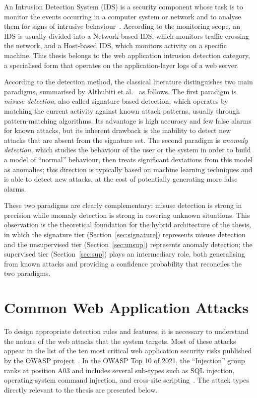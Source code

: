 \documentclass[../main.tex]{subfiles}
\begin{document}
An Intrusion Detection System (IDS) is a security component whose task is
to monitor the events occurring in a computer system or network and to
analyse them for signs of intrusive behaviour~\cite{tsai2009}. According to
the monitoring scope, an IDS is usually divided into a Network-based IDS,
which monitors traffic crossing the network, and a Host-based IDS, which
monitors activity on a specific machine. This thesis belongs to the web
application intrusion detection category, a specialised form that operates
on the application-layer logs of a web server.

According to the detection method, the classical literature distinguishes
two main paradigms, summarised by Althubiti et al.~\cite{althubiti2017} as
follows. The first paradigm is \emph{misuse detection}, also called
signature-based detection, which operates by matching the current activity
against known attack patterns, usually through pattern-matching
algorithms. Its advantage is high accuracy and few false alarms for known
attacks, but its inherent drawback is the inability to detect new attacks
that are absent from the signature set. The second paradigm is
\emph{anomaly detection}, which studies the behaviour of the user or the
system in order to build a model of ``normal'' behaviour, then treats
significant deviations from this model as anomalies; this direction is
typically based on machine learning techniques and is able to detect new
attacks, at the cost of potentially generating more false alarms.

These two paradigms are clearly complementary: misuse detection is strong
in precision while anomaly detection is strong in covering unknown
situations. This observation is the theoretical foundation for the hybrid
architecture of the thesis, in which the signature tier
(Section~\ref{sec:signature}) represents misuse detection and the
unsupervised tier (Section~\ref{sec:unsup}) represents anomaly detection;
the supervised tier (Section~\ref{sec:sup}) plays an intermediary role,
both generalising from known attacks and providing a confidence
probability that reconciles the two paradigms.

\section{Common Web Application Attacks}
\label{sec:webattacks}

To design appropriate detection rules and features, it is necessary to
understand the nature of the web attacks that the system targets. Most of
these attacks appear in the list of the ten most critical web application
security risks published by the OWASP project~\cite{owasp2021}. In the
OWASP Top 10 of 2021, the ``Injection'' group ranks at position A03 and
includes several sub-types such as SQL injection, operating-system command
injection, and cross-site scripting~\cite{owasp2021}. The attack types
directly relevant to the thesis are presented below.
\end{document}
